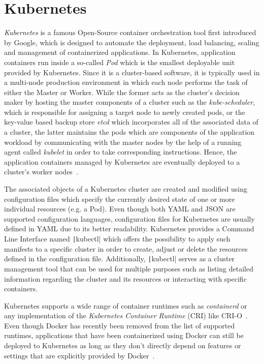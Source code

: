 \section{Kubernetes}
\textit{Kubernetes} is a famous Open-Source container orchestration tool first introduced by Google, which is designed to automate the deployment, load balancing, scaling and management of containerized applications. In Kubernetes, application containers run inside a so-called \textit{Pod} which is the smallest deployable unit provided by Kubernetes. Since it is a cluster-based software, it is typically used in a multi-node production environment in which each node performs the task of either the Master or Worker. While the former acts as the cluster's decision maker by hosting the master components of a cluster such as the \textit{kube-scheduler}, which is responsible for assigning a target node to newly created pods, or the key-value based backup store \textit{etcd} which incorporates all of the associated data of a cluster, the latter maintains the pods which are components of the application workload by communicating with the master nodes by the help of a running agent called \textit{kubelet} in order to take corresponding instructions. Hence, the application containers managed by Kubernetes are eventually deployed to a cluster's worker nodes~\parencite{k8s-components}.

The associated objects of a Kubernetes cluster are created and modified using configuration files which specify the currently desired state of one or more individual resources (e.g. a Pod). Even though both YAML and JSON are supported configuration languages, configuration files for Kubernetes are usually defined in YAML due to its better readability. Kubernetes provides a Command Line Interface named \texttt|kubectl| which offers the possibility to apply such manifests to a specific cluster in order to create, adjust or delete the resources defined in the configuration file. Additionally, \texttt|kubectl| serves as a cluster management tool that can be used for multiple purposes such as listing detailed information regarding the cluster and its resources or interacting with specific containers.

Kubernetes supports a wide range of container runtimes such as \textit{containerd} or any implementation of the \textit{Kubernetes Container Runtime} (CRI) like CRI-O~\parencite{k8s-components}. Even though Docker has recently been removed from the list of supported runtimes, applications that have been containerized using Docker can still be deployed to Kubernetes as long as they don't directly depend on features or settings that are explicitly provided by Docker~\parencite{k8s-docker-drop}.

